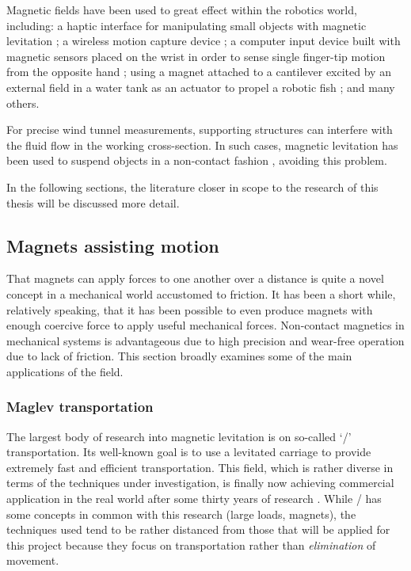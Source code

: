 \documentclass[11pt,a4paper]{memoir}
\begin{document}
Magnetic fields have been used to great effect within the robotics world, including:
a haptic interface for manipulating small objects with magnetic levitation \cite{vanwest2007};
a wireless motion capture device \cite{hashi2005};
a computer input device built with magnetic sensors placed on the wrist in order to sense single finger-tip motion from the opposite hand \cite{han2008};
using a magnet attached to a cantilever excited by an external field in a water tank as an actuator to propel a robotic fish \cite{tomie2005};
and many others.

For precise wind tunnel measurements, supporting structures can interfere with the fluid flow in the working cross-section.
In such cases, magnetic levitation has been used to suspend objects in a non-contact fashion \cite{higuchi2008}, avoiding this problem.

In the following sections, the literature closer in scope to the research of this thesis will be discussed more detail.


\subsection{Magnets assisting motion}

That magnets can apply forces to one another over a distance is quite a novel concept in a mechanical world accustomed to friction.
It has been a short while, relatively speaking, that it has been possible to even produce magnets with enough coercive force to apply useful mechanical forces.
Non-contact magnetics in mechanical systems is advantageous due to high precision and wear-free operation due to lack of friction.
This section broadly examines some of the main applications of the field.


\subsubsection{Maglev transportation}

The largest body of research into magnetic levitation is on so-called `\maglev/' transportation.
Its well-known goal is to use a levitated carriage to provide extremely fast and efficient transportation.
This field, which is rather diverse in terms of the techniques under investigation, is finally now achieving commercial application in the real world after some thirty years of research \parencite{lee2006-ietm}.
While \maglev/ has some concepts in common with this research (large loads, magnets), the techniques used tend to be rather distanced from those that will be applied for this project because they focus on transportation rather than \emph{elimination} of movement.
\end{document}

